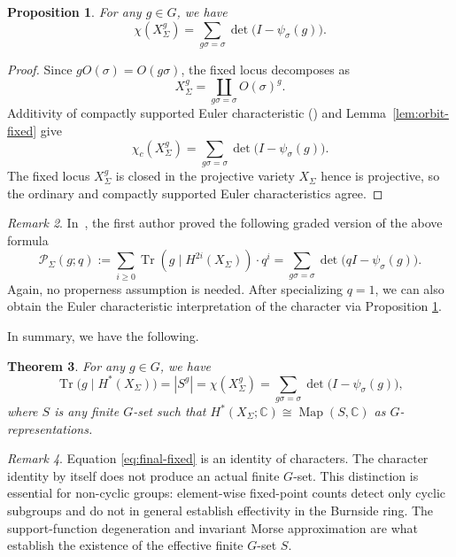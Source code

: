 \documentclass[12pt]{amsart}
\newtheorem{theorem}{Theorem}[section]
\newtheorem{prop}[theorem]{Proposition}
\theoremstyle{remark}
\newtheorem{remark}[theorem]{Remark}
\begin{document}
\begin{prop} \label{prop:Euler from Det}
For any $g\in G$, we have 
$$\chi(X_\Sigma^g)=\sum_{{g\sigma=\sigma}}
   \det\bigl(I-\psi_\sigma(g)\bigr).$$
\end{prop}
\begin{proof}
Since $gO(\sigma)=O(g\sigma)$, the fixed locus decomposes as
\[
  X_\Sigma^g
  =\coprod_{g\sigma=\sigma}
   O(\sigma)^g.
\]
Additivity of compactly supported Euler characteristic (\cite[Section 4.5]{Fulton}) and
Lemma~\ref{lem:orbit-fixed} give
$$
  \chi_c(X_\Sigma^g)
  =\sum_{g\sigma=\sigma}
   \det\bigl(I-\psi_\sigma(g)\bigr).
$$
The fixed locus $X_\Sigma^g$ is closed in the projective variety $X_\Sigma$ hence is projective, so the ordinary and compactly supported Euler
characteristics agree. 
\end{proof}

\begin{remark}
In~\cite[Theorem~1.1 and equation~(3.6)]{Gui}, the first author proved the following graded version of the above formula
$$
  \mathcal{P}_{\Sigma}(g;q)
  :=\sum_{i\geq0}\operatorname{Tr}(g\mid H^{2i}(X_\Sigma))\cdot q^i
  =\sum_{g\sigma=\sigma}
   \det\bigl(qI-\psi_\sigma(g)\bigr).
$$
Again, no properness assumption is needed. 
After specializing $q=1$, we can also obtain the Euler characteristic interpretation of the character via Proposition \ref{prop:Euler from Det}. 
\end{remark}

In summary, we have the following. 

\begin{theorem}For any $g\in G$, we have
\begin{equation}\label{eq:final-fixed}
\operatorname{Tr}\big(g\mid H^{*}(X_\Sigma)\big)
= |S^g|=\chi(X_\Sigma^g)
=\sum_{g\sigma=\sigma}
   \det\bigl(I-\psi_\sigma(g)\bigr),
\end{equation}
where $S$ is any finite $G$-set such that \(H^*(X_\Sigma;\mathbb{C})\cong\operatorname{Map}(S,\mathbb{C})\)
as \(G\)-representations.
\end{theorem}

\begin{remark}\label{rem:Burnside}
Equation \eqref{eq:final-fixed} is an identity of characters. The character identity by itself does not produce
an actual finite $G$-set. This distinction is essential for non-cyclic groups: element-wise fixed-point counts detect only cyclic subgroups and do not in general establish effectivity in the Burnside ring. The support-function degeneration and invariant Morse approximation are what establish the existence of the effective finite $G$-set $S$.
\end{remark}
\end{document}
